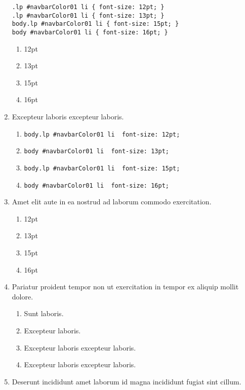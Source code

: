 \documentclass[a4paper,12pt]{article}
\begin{document}
\begin{enumerate}[label=\textbf{\arabic*.}]
  \begin{minipage}{\textwidth} %
  \begin{lstlisting}
.lp #navbarColor01 li { font-size: 12pt; }
.lp #navbarColor01 li { font-size: 13pt; }
body.lp #navbarColor01 li { font-size: 15pt; }
body #navbarColor01 li { font-size: 16pt; }
  \end{lstlisting}
  \end{minipage}
  \begin{enumerate}
    \item 12pt
    \item 13pt
    \item 15pt
    \item 16pt
  \end{enumerate}
  \item Excepteur laboris excepteur laboris.
  \begin{enumerate}
    \item \texttt{body.lp \#navbarColor01 li { font-size: 12pt; }}
    \item \texttt{body \#navbarColor01 li { font-size: 13pt; }}
    \item \texttt{body.lp \#navbarColor01 li { font-size: 15pt; }}
    \item \texttt{body \#navbarColor01 li { font-size: 16pt; }}
  \end{enumerate}
  \item Amet elit aute in ea nostrud ad laborum commodo exercitation.
  \begin{enumerate}
    \item 12pt
    \item 13pt
    \item 15pt
    \item 16pt
  \end{enumerate}
  \item Pariatur proident tempor non ut exercitation in tempor ex aliquip mollit dolore.
  \begin{enumerate}
    \item Sunt laboris.
    \item Excepteur laboris.
    \item Excepteur laboris excepteur laboris.
    \item Excepteur laboris excepteur laboris.
  \end{enumerate}
  \item Deserunt incididunt amet laborum id magna incididunt fugiat sint cillum.
  \begin{enumerate}

\end{enumerate}
\end{enumerate}
\end{document}
